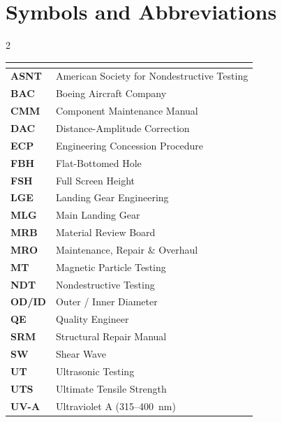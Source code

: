 \section{Symbols and Abbreviations}

\begin{multicols}{2}
\raggedcolumns
\begin{tabularx}{\linewidth}{@{}>{\color{primary}\bfseries}l X@{}}
  \toprule
  \rowcolor{primary!10}
  \multicolumn{2}{@{}l@{}}{\textbf{Abbreviation}} \\
  \midrule
  ASNT  & American Society for Nondestructive Testing \\
  BAC   & Boeing Aircraft Company \\
  CMM   & Component Maintenance Manual \\
  DAC   & Distance-Amplitude Correction \\
  ECP   & Engineering Concession Procedure \\
  FBH   & Flat-Bottomed Hole \\
  FSH   & Full Screen Height \\
  LGE   & Landing Gear Engineering \\
  MLG   & Main Landing Gear \\
  MRB   & Material Review Board \\
  MRO   & Maintenance, Repair \& Overhaul \\
  MT    & Magnetic Particle Testing \\
  NDT   & Nondestructive Testing \\
  OD/ID & Outer / Inner Diameter \\
  QE    & Quality Engineer \\
  SRM   & Structural Repair Manual \\
  SW    & Shear Wave \\
  UT    & Ultrasonic Testing \\
  UTS   & Ultimate Tensile Strength \\
  UV-A  & Ultraviolet A (315--400~nm) \\
  \bottomrule
\end{tabularx}
\end{multicols}

